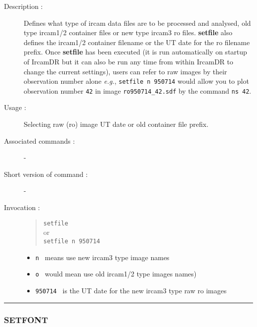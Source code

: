 \begin{description}

\item[Description :] Defines what type of {\sc ircam} data files are to be
processed and analysed, old type {\sc ircam1/2} container files or new
type {\sc ircam3} {\sc ro} files.  {\bf setfile} also defines the {\sc
ircam1/2} container filename or the UT date for the {\sc ro} filename
prefix.  Once {\bf setfile} has been executed (it is run automatically
on startup of {\sc IrcamDR} but it can also be run any time from within
{\sc IrcamDR} to change the current settings), users can refer to raw
images by their observation number alone \emph{e.g.}, {\tt setfile n
950714} would allow you to plot observation number {\tt 42} in image
{\tt ro950714\_42.sdf} by the command {\tt ns 42}.

\item[Usage :] Selecting raw ({\sc ro}) image UT date or old container file
prefix.
\item[Associated commands :] -
\item[Short version of command :] -
\item[Invocation :]

\begin{quote}{\tt  setfile }\\
or \\
{\tt setfile n 950714 }
\end{quote}

\begin{itemize}

\item {\tt n } means use new {\sc ircam3} type image names
\item {\tt o } would mean use old {\sc ircam1/2} type images names)
\item {\tt 950714 } is the UT date for the new {\sc ircam3} type raw {\sc ro} images
\end{itemize}

\end{description}

\hrule
\subsubsection*{\label{SETFONT}SETFONT}

